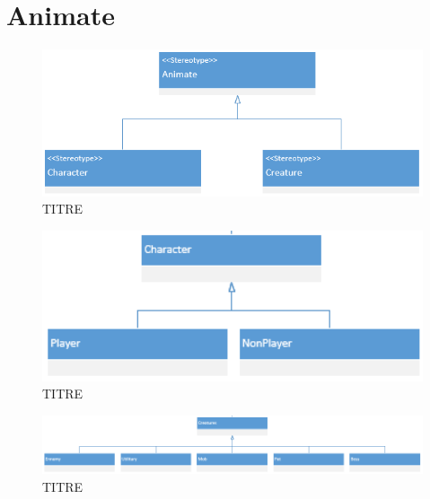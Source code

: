 \section*{Animate}
\begin{figure}[H]
    \centering
    \includegraphics[width=14cm]{10_img/chap5/02_00_animate.PNG} 
    \caption{TITRE}
\end{figure}
\begin{figure}[H]
    \centering
    \includegraphics[width=14cm]{10_img/chap5/02_00_01_character.PNG} 
    \caption{TITRE}
\end{figure}
\begin{figure}[H]
    \centering
    \includegraphics[width=14cm]{10_img/chap5/02_00_02_creature.PNG} 
    \caption{TITRE}
\end{figure}



